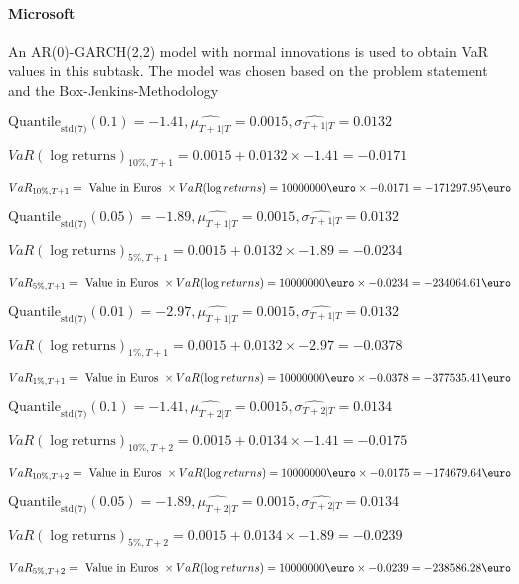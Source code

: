 \paragraph{Microsoft}
 An AR(0)-GARCH(2,2) model with normal innovations is used to obtain VaR values in this subtask. The model was chosen based on the problem statement and the Box-Jenkins-Methodology



$\text{Quantile}_\text{std(7)}(0.1) = -1.41,\hat{\mu_{T+1|T}} = 0.0015, \hat{\sigma_{T+1|T}} = 0.0132$

$VaR(\log \text{returns})_{10\%, T + 1} = 0.0015 + 0.0132\times-1.41 = -0.0171$

$VaR_{10\%, T + 1} = \text{ Value in Euros } \times VaR(\log returns) = 10 000 000 \text{\euro} \times-0.0171 = -171297.95 \text{\euro}$


$\text{Quantile}_\text{std(7)}(0.05) = -1.89,\hat{\mu_{T+1|T}} = 0.0015, \hat{\sigma_{T+1|T}} = 0.0132$

$VaR(\log \text{returns})_{5\%, T + 1} = 0.0015 + 0.0132\times-1.89 = -0.0234$

$VaR_{5\%, T + 1} = \text{ Value in Euros } \times VaR(\log returns) = 10 000 000 \text{\euro} \times-0.0234 = -234064.61 \text{\euro}$


$\text{Quantile}_\text{std(7)}(0.01) = -2.97,\hat{\mu_{T+1|T}} = 0.0015, \hat{\sigma_{T+1|T}} = 0.0132$

$VaR(\log \text{returns})_{1\%, T + 1} = 0.0015 + 0.0132\times-2.97 = -0.0378$

$VaR_{1\%, T + 1} = \text{ Value in Euros } \times VaR(\log returns) = 10 000 000 \text{\euro} \times-0.0378 = -377535.41 \text{\euro}$


$\text{Quantile}_\text{std(7)}(0.1) = -1.41,\hat{\mu_{T+2|T}} = 0.0015, \hat{\sigma_{T+2|T}} = 0.0134$

$VaR(\log \text{returns})_{10\%, T + 2} = 0.0015 + 0.0134\times-1.41 = -0.0175$

$VaR_{10\%, T + 2} = \text{ Value in Euros } \times VaR(\log returns) = 10 000 000 \text{\euro} \times-0.0175 = -174679.64 \text{\euro}$


$\text{Quantile}_\text{std(7)}(0.05) = -1.89,\hat{\mu_{T+2|T}} = 0.0015, \hat{\sigma_{T+2|T}} = 0.0134$

$VaR(\log \text{returns})_{5\%, T + 2} = 0.0015 + 0.0134\times-1.89 = -0.0239$

$VaR_{5\%, T + 2} = \text{ Value in Euros } \times VaR(\log returns) = 10 000 000 \text{\euro} \times-0.0239 = -238586.28 \text{\euro}$


